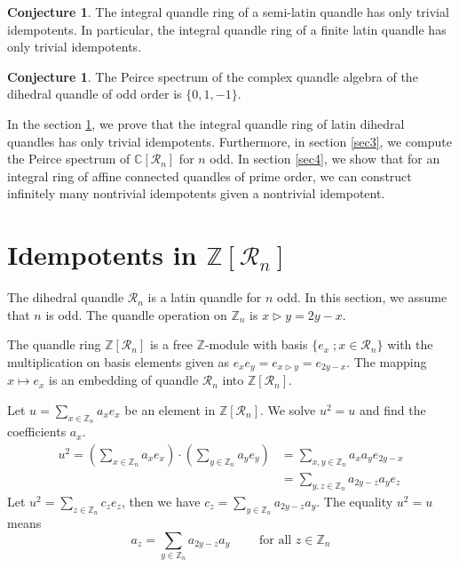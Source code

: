 \documentclass[10pt,twoside,reqno]{amsart}
\theoremstyle{definition}
\newtheorem{conjecture}[theorem]{Conjecture}
\numberwithin{equation}{section}
\begin{document}
\begin{conjecture}\cite[Conjecture 3.10]{ENSD23} \label{c1}
The integral quandle ring of a semi-latin quandle has only trivial idempotents. In particular, the integral quandle ring of a finite latin quandle has only trivial idempotents.
\end{conjecture}

\begin{conjecture} \cite[Conjecture 7.6]{ENS23} \label{c2}
The Peirce spectrum of the complex quandle algebra of the dihedral quandle of odd order is $\{0,1,-1\}$.
\end{conjecture}

In the section \ref{sec2}, we prove that the integral quandle ring of latin dihedral quandles has only trivial idempotents. Furthermore, in section \ref{sec3}, we compute the Peirce spectrum of $\mathbb C[\mathcal R_n]$ for $n$ odd. In section \ref{sec4}, we show that for an integral ring of affine connected quandles of prime order, we can construct infinitely many nontrivial idempotents given a nontrivial idempotent.

\section{Idempotents in $\mathbb Z[\mathcal R_n]$} \label{sec2}

The dihedral quandle $\mathcal R_n$ is a latin quandle for $n$ odd. In this section, we assume that $n$ is odd. The quandle operation on $\mathbb Z_n$ is $x\triangleright y=2y-x$.

The quandle ring $\mathbb Z[\mathcal R_n]$ is a free $\mathbb Z$-module with basis $\{e_x\;;x\in \mathcal R_n \}$ with the multiplication on basis elements given as $e_xe_y=e_{x\triangleright y}=e_{2y-x}$. The mapping $x\mapsto e_x$ is an embedding of quandle $\mathcal R_n$ into $\mathbb Z[\mathcal R_n]$.

Let $u=\sum\limits_{x\in \mathbb Z_n}a_xe_x$ be an element in $\mathbb Z[\mathcal R_n]$. We solve $u^2=u$ and find the coefficients $a_x$.
\begin{align*}
u^2= \left( \sum\limits_{x\in \mathbb Z_n}a_xe_x \right)\cdot \left( \sum\limits_{y\in \mathbb Z_n} a_ye_y \right)&= \sum\limits_{x,y\in \mathbb Z_n} a_xa_y e_{2y-x} \\
&=\sum\limits_{y,z\in \mathbb Z_n}a_{2y-z}a_ye_z
\end{align*} 
Let $u^2=\sum\limits_{z\in \mathbb Z_n}c_ze_z$, then we have $c_z=\sum\limits_{y\in \mathbb Z_n}a_{2y-z}a_y$. The equality $u^2=u$ means
\[ a_z= \sum\limits_{y\in \mathbb Z_n} a_{2y-z}a_y \quad \quad   \text{ for all } z \in \mathbb Z_n\]
\end{document}
